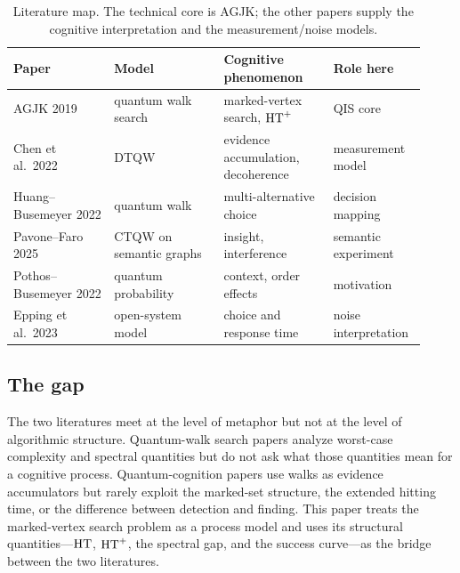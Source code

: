 \begin{table}[t]
  \centering
  \small
  \begin{tabular}{@{}p{0.23\linewidth}p{0.25\linewidth}p{0.25\linewidth}p{0.19\linewidth}@{}}
    \toprule
    Paper & Model & Cognitive phenomenon & Role here \\
    \midrule
    AGJK 2019 & quantum walk search & marked-vertex search, $\mathrm{HT}^+$ & QIS core \\
    Chen et al.\ 2022 & DTQW & evidence accumulation, decoherence & measurement model \\
    Huang--Busemeyer 2022 & quantum walk & multi-alternative choice & decision mapping \\
    Pavone--Faro 2025 & CTQW on semantic graphs & insight, interference & semantic experiment \\
    Pothos--Busemeyer 2022 & quantum probability & context, order effects & motivation \\
    Epping et al.\ 2023 & open-system model & choice and response time & noise interpretation \\
    \bottomrule
  \end{tabular}
  \caption{Literature map. The technical core is AGJK; the other papers supply
  the cognitive interpretation and the measurement/noise models.}
  \label{tab:literature}
\end{table}

\subsection{The gap}
\label{sec:background-gap}

The two literatures meet at the level of metaphor but not at the level of
algorithmic structure. Quantum-walk search papers analyze worst-case
complexity and spectral quantities but do not ask what those quantities mean
for a cognitive process. Quantum-cognition papers use walks as evidence
accumulators but rarely exploit the marked-set structure, the extended hitting
time, or the difference between detection and finding. This paper treats the
marked-vertex search problem as a process model and uses its structural
quantities---$\mathrm{HT}$, $\mathrm{HT}^+$, the spectral gap, and the success curve---as the
bridge between the two literatures.
